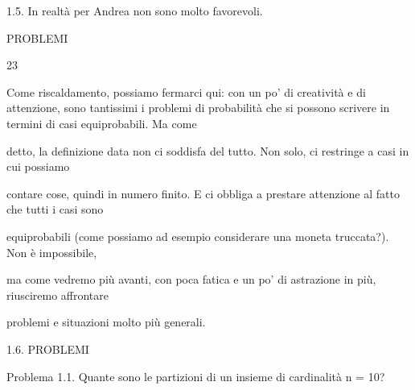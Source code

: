 \documentclass[a4paper,portrait,12pt]{article}
\begin{document}
\begin{flushleft}
1.5. In realt\`{a} per Andrea non sono molto favorevoli.
\end{flushleft}





\begin{flushleft}
 PROBLEMI
\end{flushleft}





23





\begin{flushleft}
Come riscaldamento, possiamo fermarci qui: con un po' di creativit\`{a} e di attenzione, sono tantissimi i problemi di probabilit\`{a} che si possono scrivere in termini di casi equiprobabili. Ma come
\end{flushleft}


\begin{flushleft}
detto, la definizione data non ci soddisfa del tutto. Non solo, ci restringe a casi in cui possiamo
\end{flushleft}


\begin{flushleft}
contare cose, quindi in numero finito. E ci obbliga a prestare attenzione al fatto che tutti i casi sono
\end{flushleft}


\begin{flushleft}
equiprobabili (come possiamo ad esempio considerare una moneta truccata?). Non \`{e} impossibile,
\end{flushleft}


\begin{flushleft}
ma come vedremo più avanti, con poca fatica e un po' di astrazione in più, riusciremo affrontare
\end{flushleft}


\begin{flushleft}
problemi e situazioni molto più generali.
\end{flushleft}





\begin{flushleft}
1.6. PROBLEMI
\end{flushleft}


\begin{flushleft}
Problema 1.1. Quante sono le partizioni di un insieme di cardinalit\`{a} n = 10?
\end{flushleft}
\end{document}
